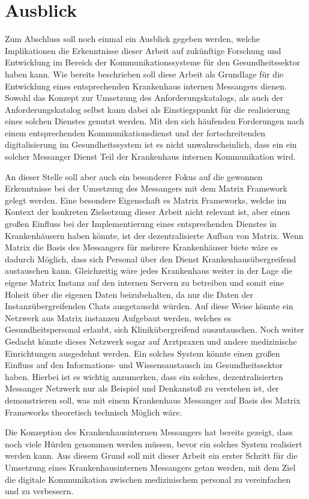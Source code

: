 \section{Ausblick}\label{chapter:fazit}
Zum Abschluss soll noch einmal ein Ausblick gegeben werden, welche Implikationen die Erkenntnisse dieser Arbeit auf zukünftige Forschung und Entwicklung im Bereich der Kommunikationssysteme für den Gesundheitssektor haben kann. Wie bereits beschrieben soll diese Arbeit als Grundlage für die Entwicklung eines entsprechenden Krankenhaus internen Messangers dienen. Sowohl das Konzept zur Umsetzung des Anforderungskatalogs, als auch der Anforderungskatalog selbst kann dabei als Einstiegspunkt für die realisierung eines solchen Dienstes genutzt werden. Mit den sich häufenden Forderungen nach einem entsprechenden Kommunikationsdienst und der fortschreitenden digitalisierung im Gesundheitssystem ist es nicht unwahrscheinlich, dass ein ein solcher Messanger Dienst Teil der Krankenhaus internen Kommunikation wird. 

An dieser Stelle soll aber auch ein besonderer Fokus auf die gewonnen Erkenntnisse bei der Umsetzung des Messangers mit dem Matrix Framework gelegt werden. Eine besondere Eigenschaft es Matrix Frameworks, welche im Kontext der konkreten Zielsetzung dieser Arbeit nicht relevant ist, aber einen großen Einfluss bei der Implementierung eines entsprechenden Dienstes in Krankenhäusern haben könnte, ist der dezentralisierte Aufbau von Matrix. Wenn Matrix die Basis des Messangers für mehrere Krankenhäuser biete wäre es dadurch Möglich, dass sich Personal über den Dienst Krankenhausübergreifend austauschen kann. Gleichzeitig wäre jedes Krankenhaus weiter in der Lage die eigene Matrix Instanz auf den internen Servern zu betreiben und somit eine Hoheit über die eigenen Daten beizubehalten, da nur die Daten der Instanzübergreifenden Chats ausgetauscht würden. Auf diese Weise könnte ein Netzwerk aus Matrix instanzen Aufgebaut werden, welches es Gesundheitspersonal erlaubt, sich Klinikübergreifend auszutauschen. Noch weiter Gedacht könnte dieses Netzwerk sogar auf Arztpraxen und andere medizinische Einrichtungen ausgedehnt werden. Ein solches System könnte einen großen Einfluss auf den Informations- und Wissensaustausch im Gesundheitssektor haben. Hierbei ist es wichtig anzumerken, dass ein solches, dezentralisierten Messanger Netzwerk nur als Beispiel und Denkanstoß zu verstehen ist, der demonstrieren soll, was mit einem Krankenhaus Messanger auf Basis des Matrix Frameworks theoretisch technisch Möglich wäre. 

Die Konzeption des Krankenhausinternen Messangers hat bereits gezeigt, dass noch viele Hürden genommen werden müssen, bevor ein solches System realisiert werden kann. Aus diesem Grund soll mit dieser Arbeit ein erster Schritt für die Umsetzung eines Krankenhausinternen Messangers getan werden, mit dem Ziel die digitale Kommunikation zwischen medizinischem personal zu vereinfachen und zu verbessern. 


